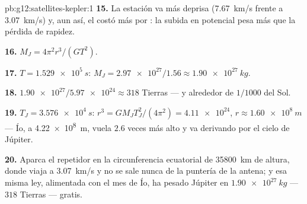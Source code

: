 \begin{solution}{pb:g12:satellites-kepler:1}
\textbf{15.} La estación va más deprisa (\qty{7.67}{km/s} frente a
\qty{3.07}{km/s}) y, aun así, el  costó más  por
: la subida en  potencial pesa más que la pérdida de
rapidez.

\textbf{16.} $M_J = 4\pi^2 r^3/(G T^2)$.

\textbf{17.} $T = \qty{1.529e5}{s}$: $M_J = \num{2.97e27}/1.56 \approx
\qty{1.90e27}{kg}$.

\textbf{18.} $\num{1.90e27}/\num{5.97e24} \approx 318$ Tierras --- y
alrededor de $1/1000$ del Sol.

\textbf{19.} $T_J = \qty{3.576e4}{s}$: $r^3 = GM_J T_J^2/(4\pi^2) =
\num{4.11e24}$, $r \approx \qty{1.60e8}{m}$ --- Ío, a \qty{4.22e8}{m},
vuela $2.6$ veces más alto y va derivando por el cielo de Júpiter.

\textbf{20.} Aparca el repetidor en la circunferencia ecuatorial de
\qty{35800}{km} de altura, donde viaja a \qty{3.07}{km/s} y no se sale
nunca de la puntería de la antena; y esa misma ley, alimentada con el
mes de Ío, ha pesado Júpiter en $\qty{1.90e27}{kg}$ --- $318$ Tierras
--- gratis.
\end{solution}
